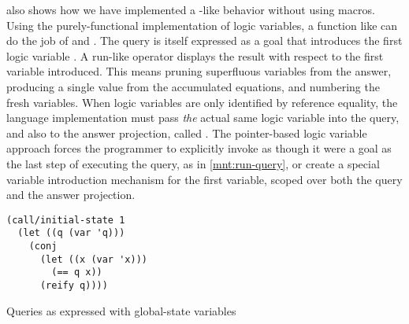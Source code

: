 \documentclass[sigplan,balance,pbalance,natbib=false]{acmart}
\begin{document}
 also shows how we have
implemented a -like behavior without using macros.
Using the purely-functional implementation of logic variables, a
function like  can do the job
of  and . The query is itself
expressed as a goal that introduces the first logic
variable . A run-like operator displays the result with
respect to the first variable introduced. This means pruning
superfluous variables from the answer, producing a single value from
the accumulated equations, and numbering the fresh variables. When
logic variables are only identified by reference equality, the
language implementation must pass \emph{the} actual same logic
variable into the query, and also to the answer projection,
called . The pointer-based logic variable approach
forces the programmer to explicitly invoke  as
though it were a goal as the last step of executing the query, as in
\cref{mnt:run-query}, or create a special variable introduction
mechanism for the first variable, scoped over both the query and the
answer projection.

\begin{listing}
  \begin{verbatim}
(call/initial-state 1
  (let ((q (var 'q)))
    (conj
      (let ((x (var 'x)))
        (== q x))
      (reify q))))
  \end{verbatim}
  \caption{Queries as expressed with global-state variables}\label{mnt:run-query}
\end{listing}

\paragraph{}
\end{document}
